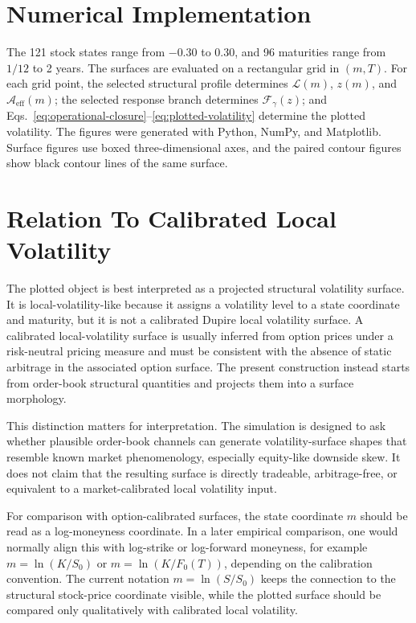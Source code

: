 \documentclass[11pt]{article}
\newcommand{\Aeff}{\mathcal A_{\mathrm{eff}}}
\newcommand{\Liq}{\mathcal L}
\newcommand{\Fresp}{\mathcal F}
\begin{document}
\section{Numerical Implementation}

The 121 stock states range from $-0.30$ to $0.30$, and 96 maturities range from $1/12$ to 2 years. The surfaces are evaluated on a rectangular grid in \((m,T)\). For each grid
point, the selected structural profile determines \(\Liq(m)\), \(z(m)\), and
\(\Aeff(m)\); the selected response branch determines \(\Fresp_\gamma(z)\);
and Eqs.~\eqref{eq:operational-closure}--\eqref{eq:plotted-volatility}
determine the plotted volatility. The figures were generated with Python,
NumPy, and Matplotlib. Surface figures use boxed three-dimensional axes, and
the paired contour figures show black contour lines of the same surface.

\section{Relation To Calibrated Local Volatility}

The plotted object is best interpreted as a projected structural volatility
surface. It is local-volatility-like because it assigns a volatility level to
a state coordinate and maturity, but it is not a calibrated Dupire local
volatility surface. A calibrated local-volatility surface is usually inferred
from option prices under a risk-neutral pricing measure and must be consistent
with the absence of static arbitrage in the associated option surface. The
present construction instead starts from order-book structural quantities and
projects them into a surface morphology.

This distinction matters for interpretation. The simulation is designed to
ask whether plausible order-book channels can generate volatility-surface
shapes that resemble known market phenomenology, especially equity-like
downside skew. It does not claim that the resulting surface is directly
tradeable, arbitrage-free, or equivalent to a market-calibrated local
volatility input.

For comparison with option-calibrated surfaces, the state coordinate \(m\)
should be read as a log-moneyness coordinate. In a later empirical comparison,
one would normally align this with log-strike or log-forward moneyness, for
example \(m=\ln(K/S_0)\) or \(m=\ln(K/F_0(T))\), depending on the calibration
convention. The current notation \(m=\ln(S/S_0)\) keeps the connection to the
structural stock-price coordinate visible, while the plotted surface should
be compared only qualitatively with calibrated local volatility.
\end{document}
